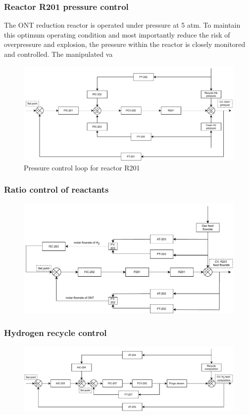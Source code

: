 \subsubsection{Reactor R201 pressure control} %
The ONT reduction reactor is operated under pressure at 5 atm. To maintain this optimum operating condition and most importantly reduce the risk of overpressure and explosion, the pressure within the reactor is closely monitored and controlled. The manipulated va 

\begin{figure}[h]
    \centering
    \includegraphics[width=0.8\linewidth]{chapters/4-operation-control/4-Figures/R201-PC.pdf}
    \caption{Pressure control loop for reactor R201}
    \label{fig:R201-PC}
\end{figure}

\subsubsection{Ratio control of reactants} %
\begin{figure}[h]
    \centering
    \includegraphics[width=0.8\linewidth]{chapters/4-operation-control/4-Figures/R201-FC.pdf}
    \caption{}
    \label{fig:R201-FC}
\end{figure} 

\subsubsection{Hydrogen recycle control}%
\begin{figure}[h]
    \centering
    \includegraphics[width=0.8\linewidth]{chapters/4-operation-control/4-Figures/V202-CC.pdf}
    \caption{}
    \label{fig:V202-CC}
\end{figure}

